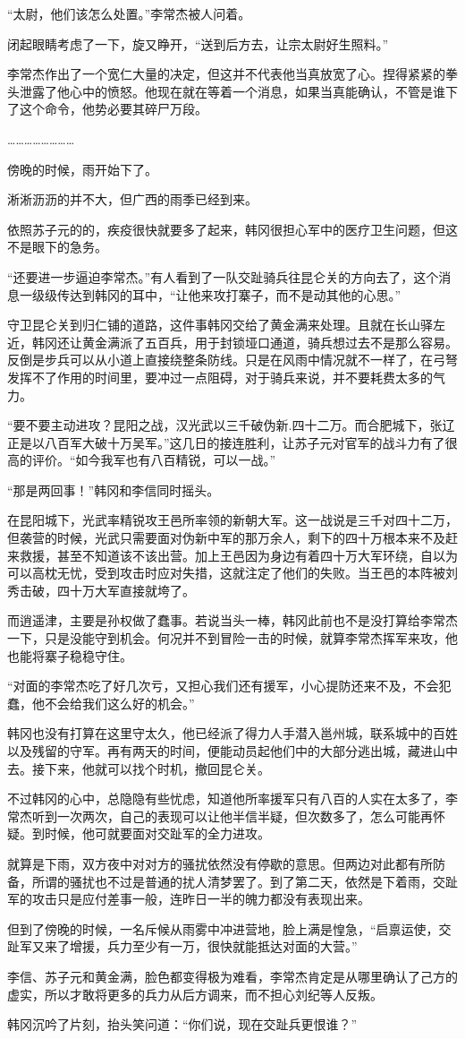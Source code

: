“太尉，他们该怎么处置。”李常杰被人问着。

闭起眼睛考虑了一下，旋又睁开，“送到后方去，让宗太尉好生照料。”

李常杰作出了一个宽仁大量的决定，但这并不代表他当真放宽了心。捏得紧紧的拳头泄露了他心中的愤怒。他现在就在等着一个消息，如果当真能确认，不管是谁下了这个命令，他势必要其碎尸万段。

……………………

傍晚的时候，雨开始下了。

淅淅沥沥的并不大，但广西的雨季已经到来。

依照苏子元的的，疾疫很快就要多了起来，韩冈很担心军中的医疗卫生问题，但这不是眼下的急务。

“还要进一步逼迫李常杰。”有人看到了一队交趾骑兵往昆仑关的方向去了，这个消息一级级传达到韩冈的耳中，“让他来攻打寨子，而不是动其他的心思。”

守卫昆仑关到归仁铺的道路，这件事韩冈交给了黄金满来处理。且就在长山驿左近，韩冈还让黄金满派了五百兵，用于封锁垭口通道，骑兵想过去不是那么容易。反倒是步兵可以从小道上直接绕整条防线。只是在风雨中情况就不一样了，在弓弩发挥不了作用的时间里，要冲过一点阻碍，对于骑兵来说，并不要耗费太多的气力。

“要不要主动进攻？昆阳之战，汉光武以三千破伪新.四十二万。而合肥城下，张辽正是以八百军大破十万吴军。”这几日的接连胜利，让苏子元对官军的战斗力有了很高的评价。“如今我军也有八百精锐，可以一战。”

“那是两回事！”韩冈和李信同时摇头。

在昆阳城下，光武率精锐攻王邑所率领的新朝大军。这一战说是三千对四十二万，但袭营的时候，光武只需要面对伪新中军的那万余人，剩下的四十万根本来不及赶来救援，甚至不知道该不该出营。加上王邑因为身边有着四十万大军环绕，自以为可以高枕无忧，受到攻击时应对失措，这就注定了他们的失败。当王邑的本阵被刘秀击破，四十万大军直接就垮了。

而逍遥津，主要是孙权做了蠢事。若说当头一棒，韩冈此前也不是没打算给李常杰一下，只是没能守到机会。何况并不到冒险一击的时候，就算李常杰挥军来攻，他也能将寨子稳稳守住。

“对面的李常杰吃了好几次亏，又担心我们还有援军，小心提防还来不及，不会犯蠢，他不会给我们这么好的机会。”

韩冈也没有打算在这里守太久，他已经派了得力人手潜入邕州城，联系城中的百姓以及残留的守军。再有两天的时间，便能动员起他们中的大部分逃出城，藏进山中去。接下来，他就可以找个时机，撤回昆仑关。

不过韩冈的心中，总隐隐有些忧虑，知道他所率援军只有八百的人实在太多了，李常杰听到一次两次，自己的表现可以让他半信半疑，但次数多了，怎么可能再怀疑。到时候，他可就要面对交趾军的全力进攻。

就算是下雨，双方夜中对对方的骚扰依然没有停歇的意思。但两边对此都有所防备，所谓的骚扰也不过是普通的扰人清梦罢了。到了第二天，依然是下着雨，交趾军的攻击只是应付差事一般，连昨日一半的魄力都没有表现出来。

但到了傍晚的时候，一名斥候从雨雾中冲进营地，脸上满是惶急，“启禀运使，交趾军又来了增援，兵力至少有一万，很快就能抵达对面的大营。”

李信、苏子元和黄金满，脸色都变得极为难看，李常杰肯定是从哪里确认了己方的虚实，所以才敢将更多的兵力从后方调来，而不担心刘纪等人反叛。

韩冈沉吟了片刻，抬头笑问道：“你们说，现在交趾兵更恨谁？”

